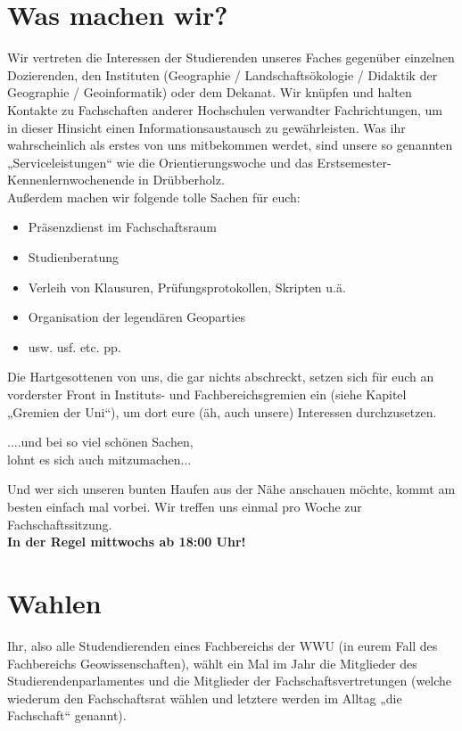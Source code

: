 \section*{Was machen wir?}
Wir vertreten die Interessen der Studierenden unseres Faches gegenüber einzelnen Dozierenden, den Instituten (Geographie / Landschaftsökologie / Didaktik der Geographie / Geoinformatik) oder dem Dekanat. Wir knüpfen und halten Kontakte zu Fachschaften anderer Hochschulen verwandter Fachrichtungen, um in dieser Hinsicht einen Informationsaustausch zu gewährleisten. Was ihr wahrscheinlich als erstes von uns mitbekommen werdet, sind unsere so genannten „Serviceleistungen“ wie die Orientierungswoche und das Erstsemester-Kennenlernwochenende in Drübberholz.
\\
Außerdem machen wir folgende tolle Sachen für euch:
\begin{itemize}
 \item Präsenzdienst im Fachschaftsraum
 \item Studienberatung
 \item Verleih von Klausuren, Prüfungsprotokollen, Skripten u.ä.
 \item Organisation der legendären Geoparties
 \item usw. usf. etc. pp.
\end{itemize}
Die Hartgesottenen von uns, die gar nichts abschreckt, setzen sich für euch an vorderster Front in Instituts- und Fachbereichsgremien ein
(siehe Kapitel „Gremien der Uni“), um dort eure (äh, auch unsere) Interessen durchzusetzen.
\begin{center}
....und bei so viel schönen Sachen,\\
lohnt es sich auch mitzumachen...
\end{center}
Und wer sich unseren bunten Haufen aus der Nähe anschauen möchte, kommt am besten einfach mal vorbei.
Wir treffen uns einmal pro Woche zur Fachschaftssitzung.\\
\textbf{In der Regel mittwochs ab 18:00 Uhr!}

\section*{Wahlen}
Ihr, also alle Studendierenden eines Fachbereichs der WWU (in eurem Fall des Fachbereichs Geowissenschaften), wählt ein Mal im Jahr die Mitglieder des Studierendenparlamentes und die Mitglieder der Fachschaftsvertretungen (welche wiederum den Fachschaftsrat wählen und letztere werden im Alltag „die Fachschaft“ genannt).


